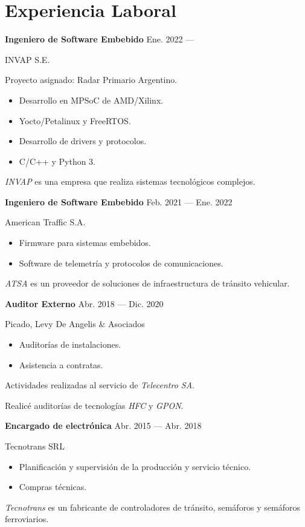 \section{Experiencia Laboral}


\parbox[t][][t]{\linewidth}{
	\parbox{\linewidth}{
		\textbf{Ingeniero de Software Embebido}
			\hfill
			{Ene. 2022 --- \phantom{Dic. 2099}}
		}
	\smallbreak
	\parbox{\linewidth}{INVAP S.E.}
	\smallbreak
	Proyecto asignado: Radar Primario Argentino.
	\begin{itemize}
	    \item{Desarrollo en MPSoC de AMD/Xilinx.}
		\item{Yocto/Petalinux y FreeRTOS.}
		\item{Desarrollo de drivers y protocolos.}
		\item{C/C++ y Python 3.}
	\end{itemize}
	\smallbreak
    \emph{INVAP} es una empresa que realiza sistemas tecnológicos complejos.
}

\bigskip
\parbox[t][][t]{\linewidth}{
	\parbox{\linewidth}{
		\textbf{Ingeniero de Software Embebido}
			\hfill
			{Feb. 2021 --- Ene. 2022}
		}
	\smallbreak
	\parbox{\linewidth}{American Traffic S.A.}
	\smallbreak
	\begin{itemize}
	    \item{Firmware para sistemas embebidos.}
	    \item{Software de telemetría y protocolos de comunicaciones.}
	\end{itemize}
	\smallbreak
    \emph{ATSA} es un proveedor de soluciones de infraestructura de tránsito vehicular.
}

\bigskip
\parbox[t][][t]{\linewidth}{
	\parbox{\linewidth}{
		\textbf{Auditor Externo}
			\hfill
			{Abr. 2018 --- Dic. 2020}
		}
	\smallbreak
	\parbox{\linewidth}{Picado, Levy De Angelis \& Asociados}
	\smallbreak
	\begin{itemize}
	    \item{Auditorías de instalaciones.}
	    \item{Asistencia a contratas.}
	\end{itemize}
	\smallbreak
	Actividades realizadas al servicio de \emph{Telecentro SA}.

    Realicé auditorías de tecnologías \emph{HFC} y \emph{GPON}.
}

\bigskip
\parbox[t][][t]{\linewidth}{
	{\parbox{\linewidth}{
		\parbox{\linewidth}{
			\textbf{Encargado de electrónica}
			\hfill
			{Abr. 2015 --- Abr. 2018}
		}
	}}
	\smallbreak
	\parbox{\linewidth}{Tecnotrans SRL}
	\smallbreak
	\begin{itemize}
	    \item{Planificación y supervisión de la producción y servicio técnico.}
	    \item{Compras técnicas.}
	\end{itemize}
	\smallbreak
	\emph{Tecnotrans} es un fabricante de controladores de tránsito, semáforos y semáforos ferroviarios.
}

